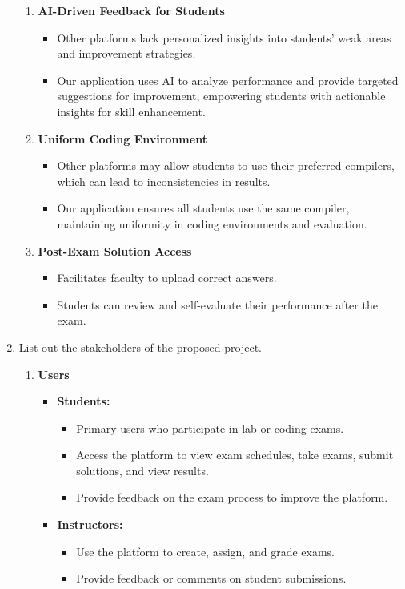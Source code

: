 \documentclass[14pt]{article}
\begin{document}
\begin{enumerate}
\begin{enumerate}
\item \textbf{AI-Driven Feedback for Students}
\begin{itemize}
\item Other platforms lack personalized insights into students' weak areas and improvement strategies.
\item Our application uses AI to analyze performance and provide targeted suggestions for improvement, empowering students with actionable insights for skill enhancement.
\end{itemize}

\item \textbf{Uniform Coding Environment}
\begin{itemize}
\item Other platforms may allow students to use their preferred compilers, which can lead to inconsistencies in results.
\item Our application ensures all students use the same compiler, maintaining uniformity in coding environments and evaluation.
\end{itemize}

\item \textbf{Post-Exam Solution Access}
\begin{itemize}
\item Facilitates faculty to upload correct answers.
\item Students can review and self-evaluate their performance after the exam.
\end{itemize}
\end{enumerate}

\item List out the stakeholders of the proposed project.
\begin{enumerate}
    \item \textbf{Users}
    \begin{itemize}
        \item \textbf{Students:}
        \begin{itemize}
            \item Primary users who participate in lab or coding exams.
            \item Access the platform to view exam schedules, take exams, submit solutions, and view results.
            \item Provide feedback on the exam process to improve the platform.
        \end{itemize}
        \item \textbf{Instructors:}
        \begin{itemize}
            \item Use the platform to create, assign, and grade exams.
            \item Provide feedback or comments on student submissions.
        \end{itemize}
    \end{itemize}


\end{enumerate}
\end{enumerate}
\end{document}
